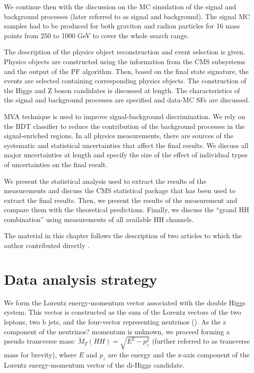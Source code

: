 \begin{small}
We continue then with the discussion on the MC simulation of the signal and background processes (later referred to as signal and background). The signal MC samples had to be produced for both graviton and radion particles for 16 mass points from 250 to 1000 GeV to cover the whole search range.  

The description of the physics object reconstruction and event selection is given. Physics objects are constructed using the information from the CMS subsystems and the output of the PF algorithm. Then, based on the final state signature, the events are selected containing corresponding physics objects. The construction of the Higgs and Z boson candidates is discussed at length. The characteristics of the signal and background processes are specified and data-MC SFs are discussed.

MVA technique is used to improve signal-background discrimination. We rely on the BDT classifier to reduce the contribution of the background processes in the signal-enriched regions. In all physics measurements, there are sources of the systematic and statistical uncertainties that affect the final results. We discuss all major uncertainties at length and specify the size of the effect of individual types of uncertainties on the final result. 

We present the statistical analysis used to extract the results of the measurements and discuss the CMS statistical package that has been used to extract the final results. Then, we present the results of the measurement and compare them with the theoretical predictions. Finally, we discuss the ``grand HH combination'' using measurements of all available HH channels.

The material in this chapter follows the description of two articles to which the author contributed directly \cite{bbZZAN, CMS-PAS-HIG-17-032}.

\section{Data analysis strategy}
\label{sec:strategy}
We form the Lorentz energy-momentum vector associated with the double Higgs system. This vector is constructed as the sum of the Lorentz vectors of the two leptons, two b jets, and the four-vector representing neutrinos (\PTslash).  As the z component of the neutrinos? momentum is unknown, we proceed forming a pseudo transverse mass:
$\tilde{M}_T(HH) = \sqrt{E^2 - p_{z}^2}$ (further referred to as transverse mass for brevity), where $E$ and $p_z$ are the energy and the z-axis component of the Lorentz energy-momentum vector of the di-Higgs candidate.


\end{small}
